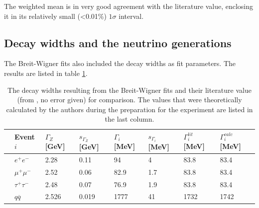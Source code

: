 The weighted mean is in very good agreement with the literature value, enclosing it in its relatively small (<0.01\%) $1\sigma$ interval.

\subsection{Decay widths and the neutrino generations}
The Breit-Wigner fits also included the decay widths as fit parameters. The results are listed in table \ref{tb:decaywidthfitresults}.  

\begin{table}[h]\centering
	\begin{tabular}{@{}llllllll@{}}
		\toprule
		&Event $i$&$\Gamma_{Z}$ [GeV]&$s_{\Gamma_{Z}}$ [GeV]&$\Gamma_i$ [MeV]&$s_{\Gamma_i}$ [MeV]&$\Gamma^{lit}_i$ [MeV]&$\Gamma^{calc}_i$ [MeV]\\
		\midrule
		&$e^+e^-$&2.28&0.11&94&4&83.8&83.4\\
		&$\mu^+\mu^-$&2.52&0.06&82.9&1.7&83.8&83.4\\
		&$\tau^+\tau^-$&2.48&0.07&76.9&1.9&83.8&83.4\\
		&$q\overline{q}$&2.526&0.019&1777&41&1732&1742\\
		\bottomrule
	\end{tabular}
	\caption[Breit-Wigner fit results: Decay widths ]{The decay widths resulting from the Breit-Wigner fits and their literature value (from \cite{staatsex}, no error given) for comparison. The values that were theoretically calculated by the authors during the preparation for the experiment are listed in the last column.}
	\label{tb:decaywidthfitresults}
\end{table}

